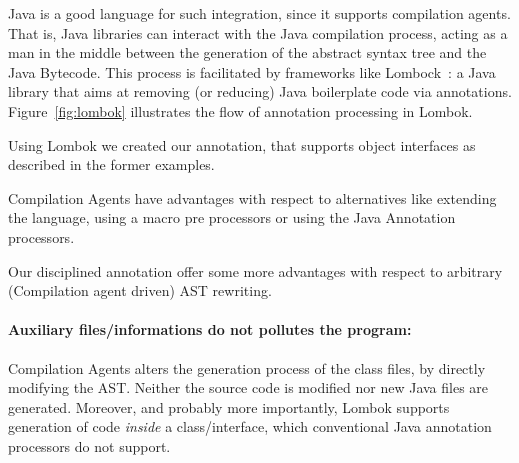 Java is a good language for such integration, since it supports compilation agents\cite{compilationagents}.
That is, Java libraries can interact with the Java compilation process,
acting as a man in the middle between the
generation of the abstract syntax tree and the Java Bytecode.
This process is facilitated by frameworks like Lombock~\cite{lombok}:
a Java library that aims at removing (or
reducing) Java boilerplate code via
annotations.
Figure~\ref{fig:lombok} illustrates the
flow of \mixin annotation processing in Lombok.

Using Lombok we created our \mixin annotation, that supports object
interfaces as described in the former examples.

Compilation Agents have advantages with respect to
alternatives like extending the language, using a macro pre processors
or using the Java Annotation processors.

Our disciplined \mixin annotation offer some more advantages with respect to arbitrary (Compilation agent driven) AST rewriting.


\paragraph{Auxiliary files/informations do not pollutes the program:}
Compilation Agents alters the generation process of the class files,
by directly modifying the AST.
Neither the source code is modified nor new Java files are generated.
Moreover, and probably more importantly, Lombok supports generation of
  code \emph{inside} a class/interface, which conventional
  Java annotation processors do not support.


